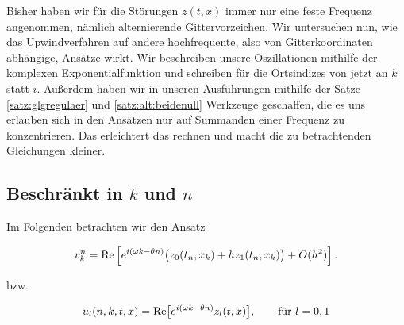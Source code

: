 
Bisher haben wir für die Störungen $z(t,x)$ immer nur eine feste Frequenz angenommen, nämlich alternierende Gittervorzeichen.
Wir untersuchen nun, wie das Upwindverfahren auf andere hochfrequente, also von Gitterkoordinaten abhängige, Ansätze wirkt.
Wir beschreiben unsere Oszillationen mithilfe der komplexen Exponentialfunktion und schreiben für die Ortsindizes von jetzt an $k$ statt $i$.
Außerdem haben wir in unseren Ausführungen mithilfe der Sätze \ref{satz:glgregulaer} und \ref{satz:alt:beidenull} Werkzeuge geschaffen, die es uns erlauben sich in den Ansätzen nur auf Summanden einer Frequenz zu konzentrieren.
Das erleichtert das rechnen und macht die zu betrachtenden Gleichungen kleiner.

\subsection*{Beschränkt in $k$ und $n$}

Im Folgenden betrachten wir den Ansatz

\begin{align}\label{eq:exp:ansatz}
v^n_k = \operatorname{Re} \left[ e^{i(\omega k - \theta n)} \bigl( z_0(t_n, x_k) + h z_1(t_n, x_k) \bigr) + O(h^2) \right].
\end{align}

bzw.

\begin{align}
u_l(n, k, t, x) = \operatorname{Re} \bigl[ e^{i (\omega k - \theta n)} z_l(t, x) \bigr], \qquad \text{für $l = 0,1$}
\end{align}


